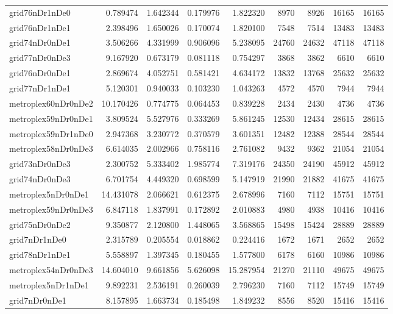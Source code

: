 \begin{longtable}{|l|r|r|r|r|r|r|r|r|}
grid76nDr1nDe0 & 0.789474 & 1.642344 & 0.179976 & 1.822320 & 8970 & 8926 & 16165 & 16165 \\
grid76nDr1nDe1 & 2.398496 & 1.650026 & 0.170074 & 1.820100 & 7548 & 7514 & 13483 & 13483 \\
grid74nDr0nDe1 & 3.506266 & 4.331999 & 0.906096 & 5.238095 & 24760 & 24632 & 47118 & 47118 \\
grid77nDr0nDe3 & 9.167920 & 0.673179 & 0.081118 & 0.754297 & 3868 & 3862 & 6610 & 6610 \\
grid76nDr0nDe1 & 2.869674 & 4.052751 & 0.581421 & 4.634172 & 13832 & 13768 & 25632 & 25632 \\
grid77nDr1nDe1 & 5.120301 & 0.940033 & 0.103230 & 1.043263 & 4572 & 4570 & 7944 & 7944 \\
metroplex60nDr0nDe2 & 10.170426 & 0.774775 & 0.064453 & 0.839228 & 2434 & 2430 & 4736 & 4736 \\
metroplex59nDr0nDe1 & 3.809524 & 5.527976 & 0.333269 & 5.861245 & 12530 & 12434 & 28615 & 28615 \\
metroplex59nDr1nDe0 & 2.947368 & 3.230772 & 0.370579 & 3.601351 & 12482 & 12388 & 28544 & 28544 \\
metroplex58nDr0nDe3 & 6.614035 & 2.002966 & 0.758116 & 2.761082 & 9432 & 9362 & 21054 & 21054 \\
grid73nDr0nDe3 & 2.300752 & 5.333402 & 1.985774 & 7.319176 & 24350 & 24190 & 45912 & 45912 \\
grid74nDr0nDe3 & 6.701754 & 4.449320 & 0.698599 & 5.147919 & 21990 & 21882 & 41675 & 41675 \\
metroplex5nDr0nDe1 & 14.431078 & 2.066621 & 0.612375 & 2.678996 & 7160 & 7112 & 15751 & 15751 \\
metroplex59nDr0nDe3 & 6.847118 & 1.837991 & 0.172892 & 2.010883 & 4980 & 4938 & 10416 & 10416 \\
grid75nDr0nDe2 & 9.350877 & 2.120800 & 1.448065 & 3.568865 & 15498 & 15424 & 28889 & 28889 \\
grid7nDr1nDe0 & 2.315789 & 0.205554 & 0.018862 & 0.224416 & 1672 & 1671 & 2652 & 2652 \\
grid78nDr1nDe1 & 5.558897 & 1.397345 & 0.180455 & 1.577800 & 6178 & 6160 & 10986 & 10986 \\
metroplex54nDr0nDe3 & 14.604010 & 9.661856 & 5.626098 & 15.287954 & 21270 & 21110 & 49675 & 49675 \\
metroplex5nDr1nDe1 & 9.892231 & 2.536191 & 0.260039 & 2.796230 & 7160 & 7112 & 15749 & 15749 \\
grid7nDr0nDe1 & 8.157895 & 1.663734 & 0.185498 & 1.849232 & 8556 & 8520 & 15416 & 15416 \\

\end{longtable}
